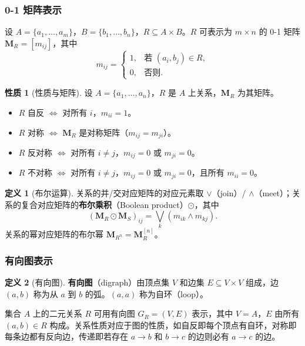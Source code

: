 \documentclass[UTF8,11pt,a4paper]{ctexbook}   %
\theoremstyle{definition}
\newtheorem{definition}{定义}[section]
\newtheorem{property}{性质}[section]
\begin{document}
\subsubsection{0-1 矩阵表示}

设 $A=\{a_1,\dots,a_m\}$，$B=\{b_1,\dots,b_n\}$，$R \subseteq A \times B$。$R$ 可表示为 $m \times n$ 的 0-1 矩阵 $\mathbf{M}_R = [m_{ij}]$，其中
\[
m_{ij} = \begin{cases}
1, & \text{若 } (a_i,b_j) \in R,\\
0, & \text{否则}.
\end{cases}
\]

\begin{property}[性质与矩阵]
设 $A=\{a_1,\dots,a_n\}$，$R$ 是 $A$ 上关系，$\mathbf{M}_R$ 为其矩阵。
\begin{itemize}
    \item $R$ 自反 $\iff$ 对所有 $i$，$m_{ii}=1$。
    \item $R$ 对称 $\iff$ $\mathbf{M}_R$ 是对称矩阵（$m_{ij}=m_{ji}$）。
    \item $R$ 反对称 $\iff$ 对所有 $i \neq j$，$m_{ij}=0$ 或 $m_{ji}=0$。
    \item $R$ 不对称 $\iff$ 对所有 $i \neq j$，$m_{ij}=0$ 或 $m_{ji}=0$，且所有 $m_{ii}=0$。
\end{itemize}
\end{property}

\begin{definition}[布尔运算]
关系的并/交对应矩阵的对应元素取 $\lor$（join）/ $\land$（meet）；关系的复合对应矩阵的\textbf{布尔乘积}（Boolean product）$\odot$，其中
\[
(\mathbf{M}_R \odot \mathbf{M}_S)_{ij} = \bigvee_{k} (m_{ik} \land m_{kj}).
\]
关系的幂对应矩阵的布尔幂 $\mathbf{M}_{R^n} = \mathbf{M}_R^{[n]}$。
\end{definition}

\subsubsection{有向图表示}

\begin{definition}[有向图]
\textbf{有向图}（digraph）由顶点集 $V$ 和边集 $E \subseteq V \times V$ 组成，边 $(a,b)$ 称为从 $a$ 到 $b$ 的弧。$(a,a)$ 称为自环（loop）。
\end{definition}

集合 $A$ 上的二元关系 $R$ 可用有向图 $G_R=(V,E)$ 表示，其中 $V=A$，$E$ 由所有 $(a,b) \in R$ 构成。关系性质对应于图的性质，如自反即每个顶点有自环，对称即每条边都有反向边，传递即若存在 $a \to b$ 和 $b \to c$ 的边则必有 $a \to c$ 的边。
\end{document}
